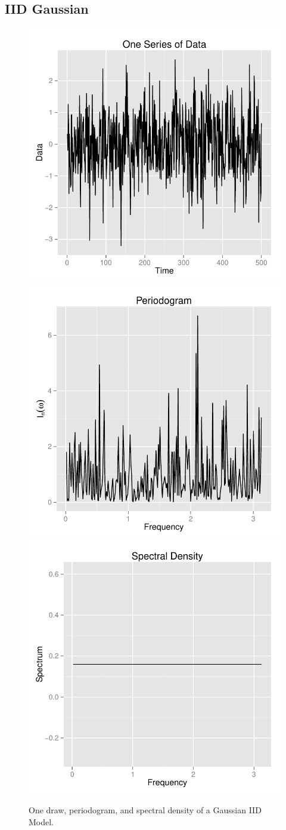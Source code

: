 \documentclass{article}\usepackage[]{graphicx}\usepackage[]{color}
\newenvironment{knitrout}{}{} %
\theoremstyle{plain}
\begin{document}
\subsection*{IID Gaussian}
\begin{knitrout}
\color{fgcolor}\begin{figure}[H]

\includegraphics[width=.33\textwidth]{figure/inital-iid1} 
\includegraphics[width=.33\textwidth]{figure/inital-iid2} 
\includegraphics[width=.33\textwidth]{figure/inital-iid3} \caption[One draw, periodogram, and spectral density of a Gaussian IID Model]{One draw, periodogram, and spectral density of a Gaussian IID Model.\label{fig:inital-iid}}
\end{figure}


\end{knitrout}
\end{document}
